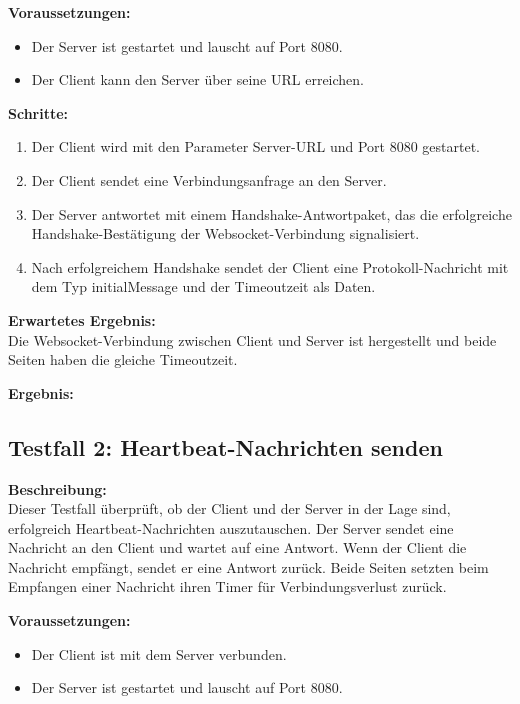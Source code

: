 \documentclass[thesis.tex]{subfiles}
\begin{document}
\textbf{Voraussetzungen:}
\begin{itemize}
    \item Der Server ist gestartet und lauscht auf Port 8080.
    \item Der Client kann den Server über seine URL erreichen.
\end{itemize}

\textbf{Schritte:}
\begin{enumerate}
    \item Der Client wird mit den Parameter Server-URL und Port 8080 gestartet.
    \item Der Client sendet eine Verbindungsanfrage an den Server.
    \item Der Server antwortet mit einem Handshake-Antwortpaket, das die erfolgreiche\\ Handshake-Bestätigung der Websocket-Verbindung signalisiert.
    \item Nach erfolgreichem Handshake sendet der Client eine Protokoll-Nachricht mit dem Typ \glqq initialMessage\grqq{} und der Timeoutzeit als Daten.
\end{enumerate}

\textbf{Erwartetes Ergebnis:}\\
Die Websocket-Verbindung zwischen Client und Server ist hergestellt und beide Seiten haben die gleiche Timeoutzeit.

\textbf{Ergebnis:}\\



\subsection*{Testfall 2: Heartbeat-Nachrichten senden}

\textbf{Beschreibung:}\\
Dieser Testfall überprüft, ob der Client und der Server in der Lage sind, erfolgreich Heartbeat-Nachrichten auszutauschen. Der Server sendet eine Nachricht an den Client und wartet auf eine Antwort. Wenn der Client die Nachricht empfängt, sendet er eine Antwort zurück. Beide Seiten setzten beim Empfangen einer Nachricht ihren Timer für Verbindungsverlust zurück.

\textbf{Voraussetzungen:}
\begin{itemize}
    \item Der Client ist mit dem Server verbunden.
    \item Der Server ist gestartet und lauscht auf Port 8080.
\end{itemize}
\end{document}
